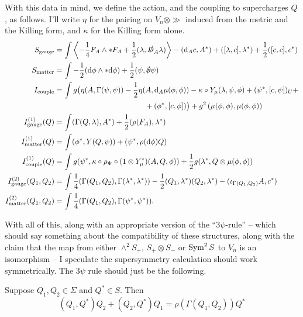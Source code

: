 \documentclass[10pt, oneside]{article}
\begin{document}
With this data in mind, we define the action, and the coupling to supercharges $Q$, as follows.  I'll write $\eta$ for the pairing on $V_n \otimes \gg$ induced from the metric and the Killing form, and $\kappa$ for the Killing form alone.
\begin{align*}
S_{\mr{gauge}} &= \int \left\langle -\frac{1}{4} F_A \wedge \ast F_A + \frac{1}{2}(\lambda, \sd D_A \lambda)\right\rangle - (\d_A c, A^*) + ([\lambda, c], \lambda^*) + \frac{1}{2}([c, c], c^*)\\
S_{\mr{matter}} &= \int - \frac{1}{2}  (\d \phi \wedge * \d \phi) + \frac{1}{2} (\psi , \sd \dd \psi)\\
I_{\mr{couple}} &= \int g\big( \eta(A, \Gamma (\psi, \psi)) - \frac 12 \eta(A, \d_A \mu( \phi, \phi)) - 
\kappa \circ Y_\mu(\lambda,\psi,\phi)  +  (\psi^*, [c, \psi])_U + \\
&\qquad\qquad\qquad\qquad\qquad\qquad +  (\phi^*, [c, \phi])\big)  +  g^2 \left(\mu(\phi, \phi), \mu(\phi, \phi) \right) \\
I^{(1)}_{\mr{gauge}}(Q) &= \int (\Gamma(Q, \lambda), A^*) + \frac{1}{2}(\rho(F_A), \lambda^*) \\
I^{(1)}_{\mr{matter}}(Q) &= \int (\phi^*, Y(Q, \psi)) + (\psi^*, \rho(\d \phi) Q)\\
I^{(1)}_{\mr{couple}}(Q) &= \int g (\psi^*, \kappa \circ \rho_\Psi \circ (1 \otimes Y_\mu^*)(A, Q, \phi)) + \frac{1}{2} g (\lambda^*, Q \otimes \mu(\phi,\phi)) \\
I^{(2)}_{\mr{gauge}}(Q_1,Q_2) &= \int \frac{1}{4}(\Gamma(Q_1, Q_2), \Gamma(\lambda^*, \lambda^*)) - \frac{1}{2}(Q_1, \lambda^*)(Q_2, \lambda^*) - (\iota_{\Gamma(Q_1, Q_2)} A, c^*) \\
I^{(2)}_{\mr{matter}}(Q_1,Q_2) &= \int \frac{1}{4}(\Gamma(Q_1, Q_2) , \Gamma(\psi^*, \psi^*)).
\end{align*}

With all of this, along with an appropriate version of the ``$3\psi$-rule'' -- which should say something about the compatibility of these structures, along with the claim that the map from either $\wedge^2S_+$, $S_+ \otimes S_-$ or $\operatorname{Sym}^2 S$ to $V_n$ is an isomorphism -- I speculate the supersymmetry calculation should work symmetrically.  The $3\psi$ rule should just be the following.

\begin{prop}\label{prop: new3psi}
Suppose $Q_1,Q_2 \in \Sigma$ and $Q^* \in S$. 
Then
\[
(Q_1, Q^*) Q_2 + (Q_2, Q^*)Q_1 = \rho(\Gamma(Q_1,Q_2)) Q^*
\]
\end{prop}
\end{document}
